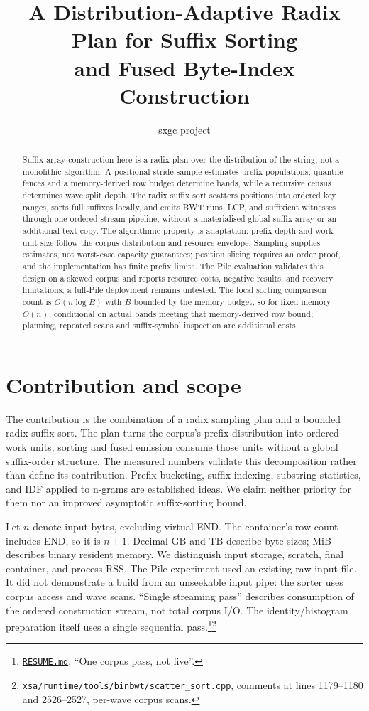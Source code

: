 \documentclass[10pt]{article}
\title{A Distribution-Adaptive Radix Plan for Suffix Sorting\\and Fused Byte-Index Construction}
\author{sxgc project}
\date{}
\newcommand{\ev}[2]{\footnote{\href{https://github.com/pangenome/sxgc/blob/c46a85217b9b269c91179cbebc396f96453181af/#1}{\nolinkurl{#1}}, #2.}}
\begin{document}
\maketitle
\begin{abstract}
Suffix-array construction here is a radix plan over the distribution of the string, not a
monolithic algorithm. A positional stride sample estimates prefix populations; quantile fences
and a memory-derived row budget determine bands, while a recursive census determines wave split
depth. The radix suffix sort scatters positions into ordered key ranges, sorts full suffixes
locally, and emits BWT runs, LCP, and suffixient witnesses through one ordered-stream pipeline,
without a materialised global suffix array or an additional text copy. The algorithmic property
is adaptation: prefix depth and work-unit size follow the corpus distribution and resource
envelope. Sampling supplies estimates, not worst-case capacity guarantees; position slicing
requires an order proof, and the implementation has finite prefix limits. The Pile evaluation
validates this design on a skewed corpus and reports resource costs, negative results, and
recovery limitations; a full-Pile deployment remains untested.
The local sorting comparison count is $O(n\log B)$ with $B$ bounded by the memory
budget, so for fixed memory $O(n)$, conditional on actual bands meeting that
memory-derived row bound; planning, repeated scans and suffix-symbol inspection are
additional costs.
\end{abstract}

\section{Contribution and scope}
The contribution is the combination of a radix sampling plan and a bounded radix suffix sort.
The plan turns the corpus's prefix distribution into ordered work units; sorting and fused
emission consume those units without a global suffix-order structure. The measured numbers
validate this decomposition rather than define its contribution. Prefix bucketing, suffix
indexing, substring statistics, and IDF applied to n-grams are established ideas. We claim neither
priority for them nor an improved asymptotic suffix-sorting bound.

Let $n$ denote input bytes, excluding virtual END. The container's row count includes END, so it is
$n+1$. Decimal GB and TB describe byte sizes; MiB describes binary resident memory. We distinguish
input storage, scratch, final container, and process RSS. The Pile experiment used an existing raw
input file. It did not demonstrate a build from an unseekable input pipe: the sorter uses corpus
access and wave scans. ``Single streaming pass'' describes consumption of the ordered construction
stream, not total corpus I/O. The identity/histogram preparation itself uses a single sequential
pass.\ev{RESUME.md}{``One corpus pass, not
five''}\ev{xsa/runtime/tools/binbwt/scatter_sort.cpp}{comments at lines 1179--1180 and 2526--2527,
per-wave corpus scans}
\end{document}
